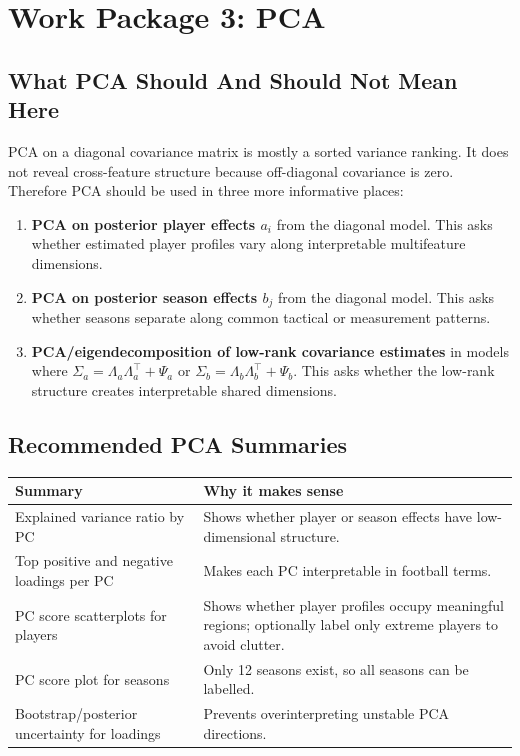 \documentclass[11pt]{article}
\begin{document}
\section{Work Package 3: PCA}

\subsection{What PCA Should And Should Not Mean Here}

PCA on a diagonal covariance matrix is mostly a sorted variance ranking. It
does not reveal cross-feature structure because off-diagonal covariance is zero.
Therefore PCA should be used in three more informative places:

\begin{enumerate}[leftmargin=*]
  \item \textbf{PCA on posterior player effects \(a_i\)} from the diagonal
  model. This asks whether estimated player profiles vary along interpretable
  multifeature dimensions.
  \item \textbf{PCA on posterior season effects \(b_j\)} from the diagonal
  model. This asks whether seasons separate along common tactical or
  measurement patterns.
  \item \textbf{PCA/eigendecomposition of low-rank covariance estimates} in
  models where \(\Sigma_a = \Lambda_a\Lambda_a^\top + \Psi_a\) or
  \(\Sigma_b = \Lambda_b\Lambda_b^\top + \Psi_b\). This asks whether the
  low-rank structure creates interpretable shared dimensions.
\end{enumerate}

\subsection{Recommended PCA Summaries}

\begin{longtable}{L{0.30\textwidth}L{0.60\textwidth}}
\toprule
Summary & Why it makes sense \\
\midrule
\endhead
Explained variance ratio by PC &
Shows whether player or season effects have low-dimensional structure. \\
Top positive and negative loadings per PC &
Makes each PC interpretable in football terms. \\
PC score scatterplots for players &
Shows whether player profiles occupy meaningful regions; optionally label only
extreme players to avoid clutter. \\
PC score plot for seasons &
Only 12 seasons exist, so all seasons can be labelled. \\
Bootstrap/posterior uncertainty for loadings &
Prevents overinterpreting unstable PCA directions. \\
\bottomrule
\end{longtable}
\end{document}
